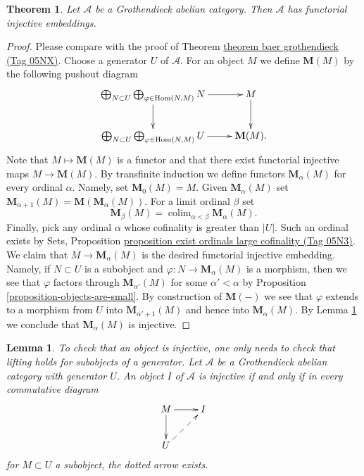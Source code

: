 \documentclass{amsart}
\newenvironment{slogan}{\comment}{\endcomment}
\theoremstyle{plain}
\newtheorem{theorem}[subsection]{Theorem}
\newtheorem{lemma}[subsection]{Lemma}
\theoremstyle{definition}
\theoremstyle{remark}
\numberwithin{equation}{subsection}
\def\colim{\mathop{\mathrm{colim}}\nolimits}
\def\Hom{\mathop{\mathrm{Hom}}\nolimits}
\begin{document}
\begin{theorem}
\label{theorem-injective-embedding-grothendieck}
Let $\mathcal{A}$ be a Grothendieck abelian category.
Then $\mathcal{A}$ has functorial injective embeddings.
\end{theorem}

\begin{proof}
Please compare with the proof of
Theorem \href{https://stacks.math.columbia.edu/tag/05NX}{theorem baer grothendieck (Tag 05NX)}.
Choose a generator $U$ of $\mathcal{A}$. For an object $M$ we define
$\mathbf{M}(M)$ by the following pushout diagram
$$
\xymatrix{
\bigoplus_{N \subset U}
\bigoplus_{\varphi \in \Hom(N, M)}
N \ar[r] \ar[d] & M \ar[d] \\
\bigoplus_{N \subset U}
\bigoplus_{\varphi \in \Hom(N, M)}
U \ar[r] &  \mathbf{M}(M).
}
$$
Note that $M \mapsto \mathbf{M}(M)$ is a functor and that there
exist functorial injective maps $M \to \mathbf{M}(M)$. By transfinite
induction we define functors $\mathbf{M}_\alpha(M)$ for every
ordinal $\alpha$. Namely, set $\mathbf{M}_0(M) = M$. Given
$\mathbf{M}_\alpha(M)$ set
$\mathbf{M}_{\alpha + 1}(M) = \mathbf{M}(\mathbf{M}_\alpha(M))$.
For a limit ordinal $\beta$ set
$$
\mathbf{M}_\beta(M) = \colim_{\alpha < \beta} \mathbf{M}_\alpha(M).
$$
Finally, pick any ordinal $\alpha$ whose cofinality is greater than $|U|$.
Such an ordinal exists by
Sets, Proposition \href{https://stacks.math.columbia.edu/tag/05N3}{proposition exist ordinals large cofinality (Tag 05N3)}.
We claim that $M \to \mathbf{M}_\alpha(M)$ is the desired functorial
injective embedding. Namely, if $N \subset U$ is a subobject and
$\varphi : N \to \mathbf{M}_\alpha(M)$ is a morphism, then we see that
$\varphi$ factors through $\mathbf{M}_{\alpha'}(M)$ for some
$\alpha' < \alpha$ by
Proposition \ref{proposition-objects-are-small}.
By construction of $\mathbf{M}(-)$ we see that $\varphi$ extends to
a morphism from $U$ into $\mathbf{M}_{\alpha' + 1}(M)$ and hence into
$\mathbf{M}_\alpha(M)$. By
Lemma \ref{lemma-characterize-injective}
we conclude that $\mathbf{M}_\alpha(M)$ is injective.
\end{proof}


\begin{lemma}
\label{lemma-characterize-injective}
\begin{slogan}
To check that an object is injective, one only needs to check that lifting
holds for subobjects of a generator.
\end{slogan}
Let $\mathcal{A}$ be a Grothendieck abelian category with generator $U$.
An object $I$ of $\mathcal{A}$ is injective if and only if in every
commutative diagram
$$
\xymatrix{
M \ar[d] \ar[r] &  I \\
U \ar@{-->}[ru]
}
$$
for $M \subset U$ a subobject, the dotted arrow exists.
\end{lemma}
\end{document}
